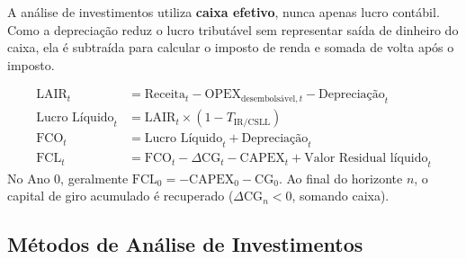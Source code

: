 A análise de investimentos utiliza \textbf{caixa efetivo}, nunca apenas lucro contábil. Como a depreciação reduz o lucro tributável sem representar saída de dinheiro do caixa, ela é subtraída para calcular o imposto de renda e somada de volta após o imposto.

\begin{boxFormula}
\begin{align*}
  \text{LAIR}_t &= \text{Receita}_t - \text{OPEX}_{\text{desembolsável}, t} - \text{Depreciação}_t \\
  \text{Lucro Líquido}_t &= \text{LAIR}_t \times (1 - T_{\text{IR/CSLL}}) \\
  \text{FCO}_t &= \text{Lucro Líquido}_t + \text{Depreciação}_t \\
  \text{FCL}_t &= \text{FCO}_t - \Delta \text{CG}_t - \text{CAPEX}_t + \text{Valor Residual líquido}_t
\end{align*}
No Ano $0$, geralmente $\text{FCL}_0 = -\text{CAPEX}_0 - \text{CG}_0$. Ao final do horizonte $n$, o capital de giro acumulado é recuperado ($\Delta \text{CG}_n < 0$, somando caixa).
\end{boxFormula}

\subsection{Métodos de Análise de Investimentos}

